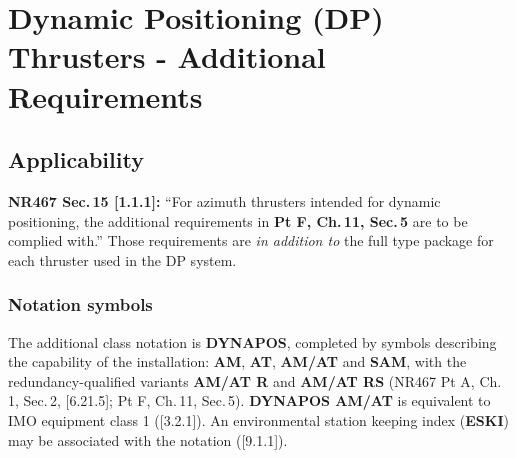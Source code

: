 \documentclass[11pt,a4paper]{report}
\begin{document}
\newpage


\chapter{Dynamic Positioning (DP) Thrusters - Additional Requirements}
\label{ch:dp}

\section{Applicability}

\textbf{NR467 Sec.\,15 [1.1.1]:} ``For azimuth thrusters intended for dynamic
positioning, the additional requirements in \textbf{Pt F, Ch.\,11, Sec.\,5} are
to be complied with.'' Those requirements are \emph{in addition to} the full
type package for each thruster used in the DP system.

\vspace{2mm}
\noindent{}

\subsection{Notation symbols}
The additional class notation is \textbf{DYNAPOS}, completed by symbols
describing the capability of the installation: \textbf{AM}, \textbf{AT},
\textbf{AM/AT} and \textbf{SAM}, with the redundancy-qualified variants
\textbf{AM/AT R} and \textbf{AM/AT RS} (NR467 Pt A, Ch.\,1, Sec.\,2, [6.21.5];
Pt F, Ch.\,11, Sec.\,5). \textbf{DYNAPOS AM/AT} is equivalent to IMO equipment
class 1 ([3.2.1]). An environmental station keeping index (\textbf{ESKI}) may be
associated with the notation ([9.1.1]).
\end{document}
